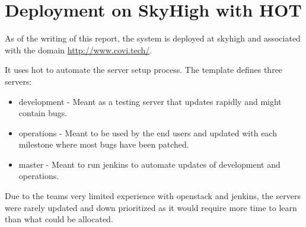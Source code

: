 \section{Deployment on SkyHigh with HOT}

As of the writing of this report, the system is deployed at \gls{skyhigh} and associated with the domain \url{http://www.covi.tech/}.

It uses \gls{hot} to automate the server setup process. The template defines three servers:

\begin{itemize}
    \item development - Meant as a testing server that updates rapidly and might contain bugs.
    \item operations - Meant to be used by the end users and updated with each milestone where most bugs have been patched.
    \item master - Meant to run \gls{jenkins} to automate updates of development and operations.
\end{itemize}

Due to the teams very limited experience with \gls{openstack} and \gls{jenkins}, the servers were rarely updated and down prioritized as it would require more time to learn than what could be allocated. 